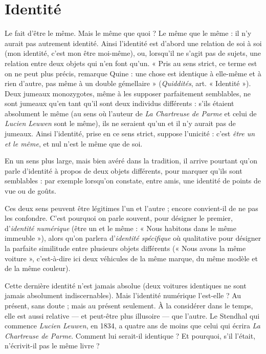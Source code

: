 \section{Identité}
Le fait d’être le même. Mais le même que quoi ? Le même que
le même : il n’y aurait pas autrement identité. Ainsi l’identité
est d’abord une relation de soi à soi (mon identité, c’est mon être moi-même),
ou, lorsqu'il ne s’agit pas de sujets, une relation entre deux objets qui n’en font
qu'un. « Pris au sens strict, ce terme est on ne peut plus précis, remarque
Quine : une chose est identique à elle-même et à rien d’autre, pas même à un
double gémellaire » ({\it Quiddités}, art. « Identité »). Deux jumeaux monozygotes,
même à les supposer parfaitement semblables, ne sont jumeaux qu’en tant qu’il
sont deux individus différents : s’ils étaient absolument le même (au sens où
l’auteur de {\it La Chartreuse de Parme} et celui de {\it Lucien Leuwen} sont le même), ils
ne seraient qu’un et il n’y aurait pas de jumeaux. Ainsi l'identité, prise en ce
sens strict, suppose l’unicité : c’est {\it être un et le même}, et nul n’est le même que
de soi.

En un sens plus large, mais bien avéré dans la tradition, il arrive pourtant
qu’on parle d'identité à propos de deux objets différents, pour marquer qu’ils
sont semblables : par exemple lorsqu'on constate, entre amis, une identité de
points de vue ou de goûts.

Ces deux sens peuvent être légitimes l’un et l’autre ; encore convient-il
de ne pas les confondre. C’est pourquoi on parle souvent, pour désigner le
premier, d'{\it identité numérique} (être un et le même : « Nous habitons dans le
même immeuble »), alors qu’on parlera d'{\it identité spécifique} où qualitative pour
désigner la parfaite similitude entre plusieurs objets différents (« Nous avons la
même voiture », c’est-à-dire ici deux véhicules de la même marque, du même
modèle et de la même couleur).

Cette dernière identité n’est jamais absolue (deux voitures identiques ne
sont jamais absolument indiscernables). Mais l'identité numérique l’est-elle ?
Au présent, sans doute ; mais au présent seulement. À la considérer dans le
temps, elle est aussi relative — et peut-être plus illusoire — que l’autre. Le
Stendhal qui commence {\it Lucien Leuwen}, en 1834, a quatre ans de moins que
celui qui écrira {\it La Chartreuse de Parme}. Comment lui serait-il identique ? Et
pourquoi, s’il l'était, n’écrivit-il pas le même livre ?

